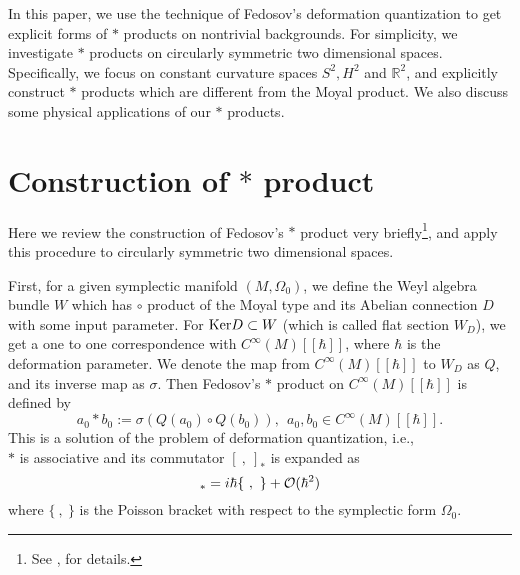 \documentclass[12pt,a4paper]{article}
\begin{document}
In this paper, we use the technique of Fedosov's deformation
quantization \cite{Fedbk} to get explicit forms of $*$ products on
nontrivial backgrounds. 
For simplicity, we investigate $*$ products on circularly symmetric two
dimensional spaces. Specifically, we focus on constant curvature
spaces $S^2,H^2$ and ${\mathbb R}^2$, and explicitly construct $*$
products which are different from the Moyal product.
We also discuss some physical applications of our $*$ products.

\section{Construction of $*$ product\label{sec:CIR}}

Here we review the construction of Fedosov's $*$ product very briefly\footnote{
See \cite{Fedbk},\cite{AK2} for details.
}, and apply this procedure to circularly symmetric two dimensional spaces.


First, for a given symplectic manifold $(M,\Omega_0)$, we define the Weyl
algebra bundle $W$ which has $\circ$ product of the Moyal type and its
Abelian connection $D$ with some input parameter.
For ${\rm Ker}D\subset W$ (which is called flat section $W_D$), we get
a one to one correspondence with $C^\infty(M)[[\hbar]]$, where $\hbar$ is the deformation parameter. 
We denote the map from $C^\infty(M)[[\hbar]]$  to $W_D$ as $Q$, and its inverse map as $\sigma$.
Then Fedosov's $*$ product on $C^\infty(M)[[\hbar]]$ is defined by
\begin{equation}
\label{eqn:STARDF}
a_0*b_0:=\sigma(Q(a_0)\circ Q(b_0)),\ \ a_0,b_0\in C^\infty(M)[[\hbar]].
\end{equation}
This is a solution of the problem of deformation quantization, i.e.,\\
$*$ is associative and its commutator $[\ ,\ ]_*$ is expanded as
\begin{equation}
[\ ,\ ]_*=i\hbar \{\ ,\ \}+{\cal O}(\hbar^2)
\end{equation}
where $\{\ ,\ \}$ is the Poisson bracket with respect to the symplectic
form $\Omega_0$.
\end{document}
